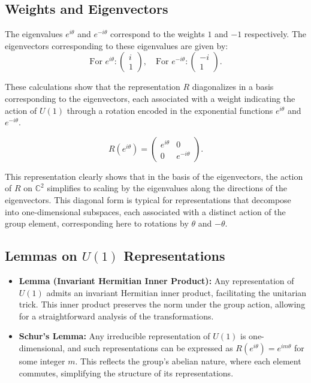 \documentclass{article}
\begin{document}
\subsection*{Weights and Eigenvectors}
The eigenvalues \( e^{i\theta} \) and \( e^{-i\theta} \) correspond to the weights \( 1 \) and \( -1 \) respectively. The eigenvectors corresponding to these eigenvalues are given by:
\[
\text{For } e^{i\theta}: \begin{pmatrix} i \\ 1 \end{pmatrix}, \quad \text{For } e^{-i\theta}: \begin{pmatrix} -i \\ 1 \end{pmatrix}.
\]

These calculations show that the representation \( R \) diagonalizes in a basis corresponding to the eigenvectors, each associated with a weight indicating the action of \( U(1) \) through a rotation encoded in the exponential functions \( e^{i\theta} \) and \( e^{-i\theta} \).

\[
R(e^{i\theta}) = \begin{pmatrix} e^{i\theta} & 0 \\ 0 & e^{-i\theta} \end{pmatrix}.
\]

This representation clearly shows that in the basis of the eigenvectors, the action of \( R \) on \( \mathbb{C}^2 \) simplifies to scaling by the eigenvalues along the directions of the eigenvectors. This diagonal form is typical for representations that decompose into one-dimensional subspaces, each associated with a distinct action of the group element, corresponding here to rotations by \( \theta \) and \( -\theta \).

\subsection*{Lemmas on \( U(1) \) Representations}
\begin{itemize}
    \item \textbf{Lemma (Invariant Hermitian Inner Product):} Any representation of \( U(1) \) admits an invariant Hermitian inner product, facilitating the unitarian trick. This inner product preserves the norm under the group action, allowing for a straightforward analysis of the transformations.
    \item \textbf{Schur's Lemma:} Any irreducible representation of \( U(1) \) is one-dimensional, and such representations can be expressed as \( R(e^{i\theta}) = e^{im\theta} \) for some integer \( m \). This reflects the group's abelian nature, where each element commutes, simplifying the structure of its representations.
\end{itemize}
\end{document}
